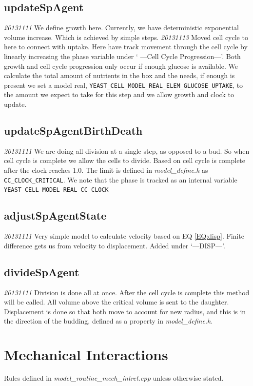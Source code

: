 \documentclass{article}
\begin{document}
\subsection{updateSpAgent}
\emph{20131111} We define growth here.  
Currently, we have deterministic exponential volume increase.
Which is achieved by simple steps.  
\emph{20131113} Moved cell cycle to here to connect with uptake.
Here have track movement through the cell cycle by linearly increasing the phase variable under ` ---Cell Cycle Progression---'.
Both growth and cell cycle progression only occur if enough glucose is available.
We calculate the total amount of nutrients in the box and the needs,
if enough is present we set a model real, \texttt{YEAST\_CELL\_MODEL\_REAL\_ELEM\_GLUCOSE\_UPTAKE},
to the amount we expect to take for this step and we allow growth and clock to update.



\subsection{updateSpAgentBirthDeath }
\emph{20131111} We are doing all division at a single step,
as opposed to a bud.
So when cell cycle is complete we allow the cells to divide.
Based on \cite{Charvin2009} cell cycle is complete after the clock reaches 1.0.
The limit is defined in \textit{model\_define.h} as \texttt{CC\_CLOCK\_CRITICAL}.
We note that the phase is tracked as an internal variable \texttt{YEAST\_CELL\_MODEL\_REAL\_CC\_CLOCK}

\subsection{adjustSpAgentState}
\emph{20131111} Very simple model to calculate velocity based on EQ \ref{EQ:disp}.
Finite difference gets us from velocity to displacement.
Added under `---DISP---'.

\subsection{divideSpAgent}
\emph{20131111} Division is done all at once.  
After the cell cycle is complete this method will be called.
All volume above the critical volume is sent to the daughter.
Displacement is done so that both move to account for new radius, 
and this is in the direction of the budding, defined as a property in \textit{model\_define.h}.
 

\section{Mechanical Interactions}
Rules defined in \textit{model\_routine\_mech\_intrct.cpp} unless otherwise stated.
\end{document}
